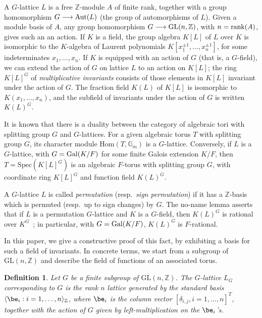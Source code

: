 \documentclass[12pt]{article}
\theoremstyle{plain}
\newtheorem{definition}[theorem]{Definition}
\newcommand{\Z}{\ensuremath{\mathbb{Z}}}
\begin{document}
A $G$-lattice $L$ is a free $\Z$-module $A$ of finite rank, together
with a group homomorphism $G \longrightarrow {\rm Aut}(L)$ (the group
of automorphisms of $L$). Given a module basis of $A$, any group
homomorphism $G \longrightarrow {\rm GL}(n,\Z)$, with $n={\rm
  rank}(A)$, gives such an an action.  If $K$ is a field, the group
algebra $K[L]$ of $L$ over $K$ is isomorphic to the $K$-algebra of
Laurent polynomials $K[x_1^{\pm 1},\dots,x_n^{\pm 1}]$, for some
indeterminates $x_1,\dots,x_n$.  If $K$ is equipped with an action of
$G$ (that is, a $G$-field), we can extend the action of $G$ on lattice
$L$ to an action on $K[L]$; the ring $K[L]^G$ of {\em multiplicative
  invariants} consists of those elements in $K[L]$ invariant under the
action of $G$. The fraction field $K(L)$ of $K[L]$ is isomorphic to
$K(x_1,\dots,x_n)$, and the subfield of invariants under the action of
$G$ is written $K(L)^G$.

It is known that there is a duality between the category of algebraic
tori with splitting group $G$ and $G$-lattices. For a given algebraic
torus $T$ with splitting group $G$, its character module
$\mathrm{Hom}(T,\mathbb{G}_m)$ is a $G$-lattice. Conversely, if $L$ is
a $G$-lattice, with $G={\rm Gal}(K/F)$ for some finite Galois
extension $K/F$, then $T=\mathrm{Spec}(K[L]^G)$ is an algebraic
$F$-torus with splitting group $G$, with coordinate ring $K[L]^G$ and
function field $K(L)^G$.

A $G$-lattice $L$ is called {\em permutation} (resp.\ {\em sign
  permutation}) if it has a $\Z$-basis which is permuted (resp.\ up to
sign changes) by $G$. The no-name lemma asserts that if $L$ is a
permutation $G$-lattice and $K$ is a $G$-field, then $K(L)^G$ is
rational over $K^G$~\cite[Chapter~9.4]{Lorenz}; in particular, with
$G={\rm Gal}(K/F)$, $K(L)^G$ is $F$-rational.

In this paper, we give a constructive proof of this fact, by
exhibiting a basis for such a field of invariants.  In concrete terms,
we start from a subgroup of $\mathrm{GL}(n,\Z)$ and describe the field
of functions of an associated torus.

\begin{definition}\label{Assumption}
  Let $G$ be a finite subgroup of $\mathrm{GL}(n,\Z)$.  The
  $G$-lattice $L_G$ corresponding to $G$ is the rank $n$ lattice
  generated by the standard basis $\langle \be_i : i = 1,
  \ldots, n \rangle_\Z$, where $\be_i$ is the column vector
  $[\delta_{i,j}, i=1,\dots,n]^T$, together with the action of $G$ given
  by left-multiplication on the $\be_i$'s.
\end{definition}
\end{document}
